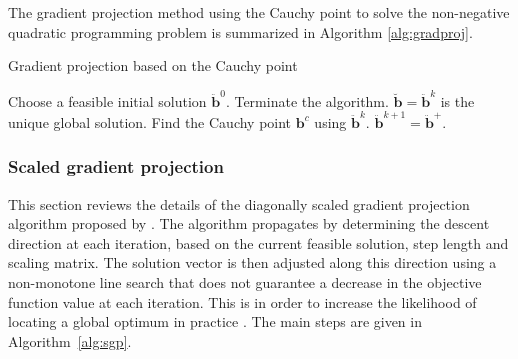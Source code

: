\documentclass[11pt]{article}
\newcommand{\0}{\phantom{0}}
\begin{document}
The gradient projection method using the Cauchy point to solve the non-negative quadratic programming problem is summarized in Algorithm \ref{alg:gradproj}.
\begin{algorithm}
	\caption{Gradient projection based on the Cauchy point}
	\label{alg:gradproj}
	\begin{spacing}{1.3}
		\begin{algorithmic}[1]
			\Require Choose a feasible initial solution $\ddot{\bm{b}}^{0}$. 
			\State Terminate the algorithm. $\breve{\bm{b}} = \ddot{\bm{b}}^{k}$ is the unique global solution.
			\Else {}
			\State Find the Cauchy point $\bm{b}^{c}$ using $\ddot{\bm{b}}^{k}$.
			\State $\ddot{\bm{b}}^{k+1} = \ddot{\bm{b}}^{+}$. 
			\EndIf
			\EndFor
		\end{algorithmic}
	\end{spacing}
\end{algorithm}

\subsubsection*{Scaled gradient projection}

This section reviews the details of the diagonally scaled gradient projection algorithm proposed by \citet{Bonettini2009}. The algorithm propagates by determining the descent direction at each iteration, based on the current feasible solution, step length and scaling matrix. The solution vector is then adjusted along this direction using a non-monotone line search that does not guarantee a decrease in the objective function value at each iteration. This is in order to increase the likelihood of locating a global optimum in practice \citep{Birgin2003}. The main steps are given in Algorithm~\ref{alg:sgp}.
\end{document}
